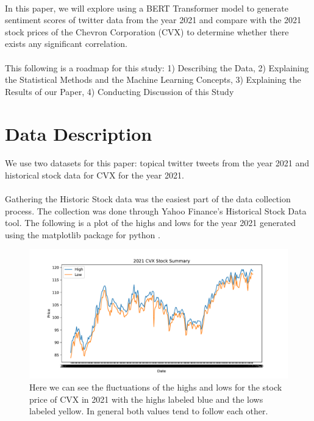 \documentclass[12pt, letterpaper, titlepage]{article}
\begin{document}
\paragraph{}
	In this paper, we will explore using a BERT Transformer model to generate sentiment scores of twitter data from the year 2021 and compare with the 2021 stock prices of the Chevron Corporation (CVX) to determine whether there exists any significant correlation. 
\paragraph{}
	This following is a roadmap for this study: 1) Describing the Data, 2) Explaining the Statistical Methods and the Machine Learning Concepts, 3) Explaining the Results of our Paper, 4) Conducting Discussion of this Study

\label{sec: datadesc}
\section{Data Description}
\paragraph{}
	We use two datasets for this paper: topical twitter tweets from the year 2021 and historical stock data for CVX for the year 2021. 
\paragraph{}
	Gathering the Historic Stock data was the easiest part of the data collection process. The collection was done through Yahoo Finance's Historical Stock Data tool. The following is a plot of the highs and lows for the year 2021 generated using the matplotlib package for python \citep{Hunter_2007}.

\begin{figure}[!hb]
  \begin{center}
  \includegraphics[width=\textwidth]{../figures/fig1.pdf}
  \caption{Here we can see the fluctuations of the highs and lows for the stock price of CVX in 2021 with the highs labeled blue and the lows labeled yellow. In general both values tend to follow each other.}\label{fig:fig1}
  \end{center}
\end{figure}
\end{document}
